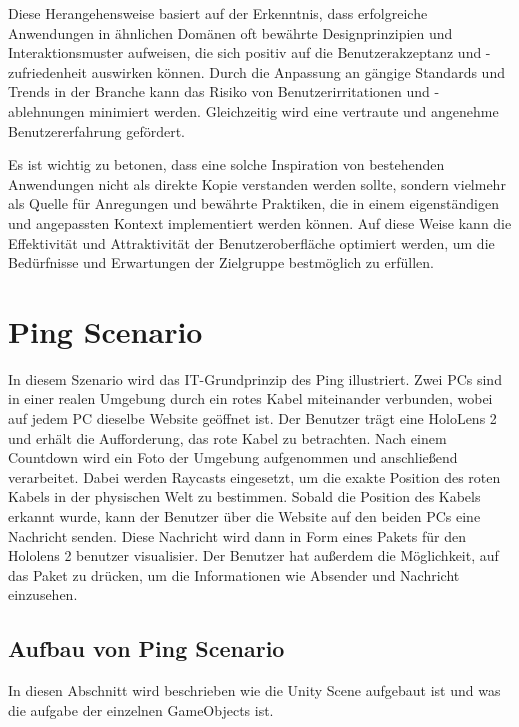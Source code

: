 Diese Herangehensweise basiert auf der Erkenntnis, dass erfolgreiche Anwendungen in ähnlichen Domänen oft bewährte
Designprinzipien und Interaktionsmuster aufweisen, die sich positiv auf die Benutzerakzeptanz und -zufriedenheit auswirken
können. Durch die Anpassung an gängige Standards und Trends in der Branche kann das Risiko von Benutzerirritationen
und -ablehnungen minimiert werden. Gleichzeitig wird eine vertraute und angenehme Benutzererfahrung gefördert.

Es ist wichtig zu betonen, dass eine solche Inspiration von bestehenden Anwendungen nicht als direkte Kopie verstanden
werden sollte, sondern vielmehr als Quelle für Anregungen und bewährte Praktiken, die in einem eigenständigen und angepassten
Kontext implementiert werden können. Auf diese Weise kann die Effektivität und Attraktivität der Benutzeroberfläche
optimiert werden, um die Bedürfnisse und Erwartungen der Zielgruppe bestmöglich zu erfüllen.



\section{Ping Scenario} 
In diesem Szenario wird das IT-Grundprinzip des Ping illustriert. Zwei PCs sind in einer realen Umgebung durch ein
rotes Kabel miteinander verbunden, wobei auf jedem PC dieselbe Website geöffnet ist. Der Benutzer trägt eine HoloLens 2
und erhält die Aufforderung, das rote Kabel zu betrachten. Nach einem Countdown wird ein Foto der Umgebung aufgenommen
und anschließend verarbeitet. Dabei werden Raycasts eingesetzt, um die exakte Position des roten Kabels in der
physischen Welt zu bestimmen. Sobald die Position des Kabels erkannt wurde, kann der Benutzer über die Website auf den
beiden PCs eine Nachricht senden. Diese Nachricht wird dann in Form eines Pakets für den Hololens 2 benutzer
visualisier. Der Benutzer hat außerdem die Möglichkeit, auf das Paket zu drücken, um die Informationen wie Absender und
Nachricht einzusehen.

\subsection{Aufbau von Ping Scenario}
In diesen Abschnitt wird beschrieben wie die Unity Scene aufgebaut ist und
was die aufgabe der einzelnen GameObjects ist.

